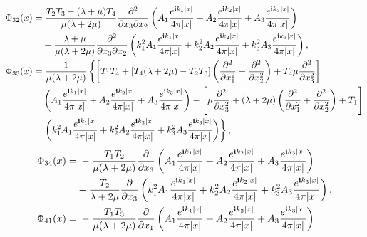 \documentclass[11pt]{article}
\newcommand{\pa}{\partial}
\newcommand{\la}{\lambda}
\begin{document}
\begin{appendices}
\begin{equation*}
\begin{aligned}
\Phi_{32}(x)
=&\;\frac{T_2T_3-(\la +\mu)T_4}{\mu(\la+2\mu)} \frac{\pa ^2}{\pa x_3\pa x_2}\left(A_1\frac{e^{{\bf i}
k_1\lvert x \rvert}}{4\pi\lvert x \rvert}+A_2\frac{e^{{\bf i}k_2\lvert x \rvert}}{4\pi\lvert x \rvert}
+A_3\frac{e^{{\bf i}k_3\lvert x \rvert}}{4\pi\lvert x \rvert}\right)\\
&+\frac{\la +\mu}{\mu(\la+2\mu)} \frac{\pa ^2}{\pa x_3\pa x_2}\left(k_1^2A_1\frac{e^{{\bf i}k_1\lvert 
x \rvert}}{4\pi\lvert x \rvert}+k_2^2A_2\frac{e^{{\bf i}k_2\lvert x \rvert}}{4\pi\lvert x \rvert}
+k_3^2A_3\frac{e^{{\bf i}k_3\lvert x \rvert}}{4\pi\lvert x \rvert}\right),\\
\Phi_{33}(x)=&\;\frac{1}{\mu(\la+2\mu)}\left\{\left[T_1T_4+[T_4(\la+2\mu)-T_2T_3]\left(\frac{\pa ^2}
{\pa x_1^2}+\frac{\pa ^2}{\pa x_2^2}\right)+T_4\mu\frac{\pa ^2}{\pa x_3^2}\right]\right.\\
&\left(A_1\frac{e^{{\bf i}k_1\lvert x \rvert}}{4\pi\lvert x \rvert}+A_2\frac{e^{{\bf i}k_2\lvert x 
\rvert}}{4\pi\lvert x \rvert}+A_3\frac{e^{{\bf i}k_3\lvert x \rvert}}{4\pi\lvert x \rvert}\right)-
\Bigg[\mu \frac{\pa ^2}{\pa x_3^2} +(\la+2\mu)\left(\frac{\pa ^2}{\pa x_1^2}+\frac{\pa ^2}
{\pa x_2^2}\right)+T_1\Bigg]\\
&\left.\left(k_1^2A_1\frac{e^{{\bf i}k_1\lvert x \rvert}}{4\pi\lvert x \rvert}+k_2^2A_2
\frac{e^{{\bf i}k_2\lvert x \rvert}}{4\pi\lvert x \rvert}+k_3^2A_3\frac{e^{{\bf i}k_3
\lvert x \rvert}}{4\pi\lvert x \rvert}\right)\right\},\\
\end{aligned}
\end{equation*}
\begin{equation*}
\begin{aligned} 
\Phi_{34}(x)
=&\;-\frac{T_1T_2}{\mu(\la+2\mu)} \frac{\pa }{\pa x_3} \left(A_1\frac{e^{{\bf i}
k_1\lvert x \rvert}}{4\pi\lvert x \rvert}+A_2\frac{e^{{\bf i}k_2\lvert x \rvert}}{4\pi
\lvert x \rvert}+A_3\frac{e^{{\bf i}k_3\lvert x \rvert}}{4\pi\lvert x \rvert}\right)\\
&+\frac{T_2}{\la+2\mu} \frac{\pa }{\pa x_3}\left(k_1^2A_1\frac{e^{{\bf i}k_1\lvert x \rvert}}
{4\pi\lvert x \rvert}+k_2^2A_2\frac{e^{{\bf i}k_2\lvert x \rvert}}{4\pi\lvert x \rvert}+k_3^2A_3
\frac{e^{{\bf i}k_3\lvert x \rvert}}{4\pi\lvert x \rvert}\right),\\
\Phi_{41}(x)
=&\;-\frac{T_1T_3}{\mu(\la+2\mu)}  \frac{\pa }{\pa x_1}\left(A_1\frac{e^{{\bf i}k_1\lvert x \rvert}}
{4\pi\lvert x \rvert}+A_2\frac{e^{{\bf i}k_2\lvert x \rvert}}{4\pi\lvert x \rvert}+A_3\frac{e^{{\bf i}
k_3\lvert x \rvert}}{4\pi\lvert x \rvert}\right)\\

\end{aligned}
\end{equation*}
\end{appendices}
\end{document}
